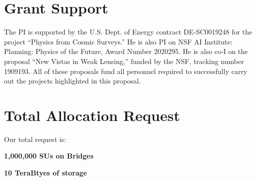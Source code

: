 \documentclass[12pt]{article}
\begin{document}
\begin{small}
\section{Grant Support}

The PI is supported by the U.S. Dept. of Energy contract DE-SC0019248 for the project ``Physics from Cosmic Surveys.'' He is also PI on NSF AI Institute: Planning: Physics of the Future, Award Number 2020295. He is also co-I on the proposal ``New Vistas in Weak Lensing,'' funded by the NSF, tracking number 1909193. All of these proposals fund all personnel required to successfully carry out the projects highlighted in this proposal.

\section{Total Allocation Request}

Our total request is:

{\bf 1,000,000 SUs on Bridges}

{\bf 10 TeraBtyes of storage}

\end{small}




\end{document}
